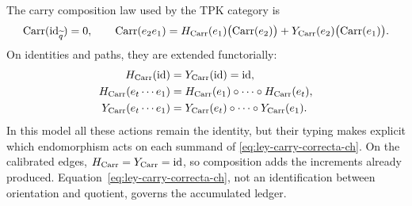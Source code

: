 The carry composition law used by the TPK category is
\begin{equation}
 \operatorname{Carr}(\operatorname{id}_{\widetilde q})=0,\qquad
 \operatorname{Carr}(e_2e_1)
 =H_{\rm Carr}(e_1)\bigl(\operatorname{Carr}(e_2)\bigr)
  +Y_{\rm Carr}(e_2)\bigl(\operatorname{Carr}(e_1)\bigr).
 \label{eq:ley-carry-correcta-ch}
\end{equation}
On identities and paths, they are extended functorially:
\[
\begin{aligned}
 H_{\rm Carr}(\operatorname{id})
   &=Y_{\rm Carr}(\operatorname{id})=\operatorname{id},\\
 H_{\rm Carr}(e_t\cdots e_1)
   &=H_{\rm Carr}(e_1)\circ\cdots\circ H_{\rm Carr}(e_t),\\
 Y_{\rm Carr}(e_t\cdots e_1)
   &=Y_{\rm Carr}(e_t)\circ\cdots\circ Y_{\rm Carr}(e_1).
\end{aligned}
\]
In this model all these actions remain the identity, but their typing makes
explicit which endomorphism acts on each summand of
\eqref{eq:ley-carry-correcta-ch}. On the calibrated edges,
\(H_{\rm Carr}=Y_{\rm Carr}=\operatorname{id}\), so composition adds the
increments already produced. Equation~\eqref{eq:ley-carry-correcta-ch}, not an
identification between orientation and quotient, governs the accumulated
ledger.

